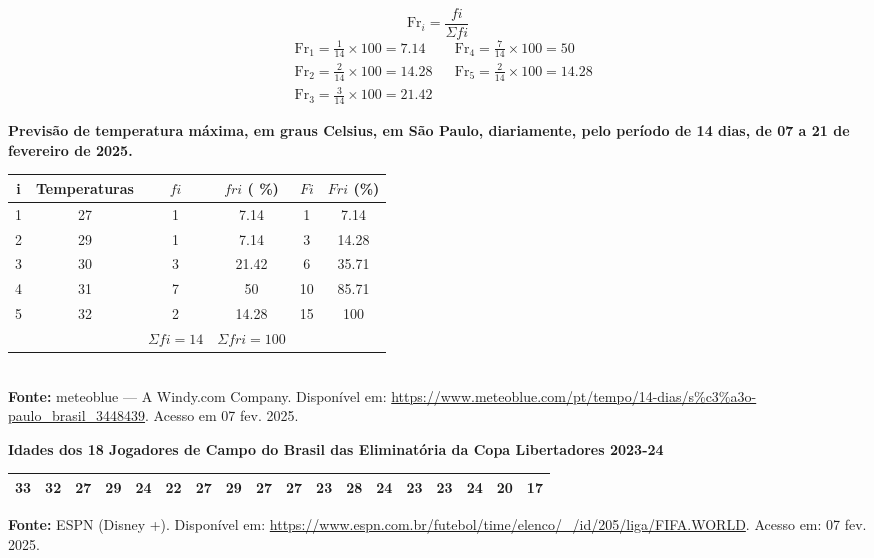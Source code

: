 \documentclass{jhwhw}
\newcommand{\fr}{\mathrm{Fr}}
\begin{document}
\[
    \fr_i = \frac{fi}{\Sigma fi} 
\]
\begin{align*}
    & \fr_1 = \frac{1}{14} \times 100 = 7.14   & & \fr_4 = \frac{7}{14} \times 100 = 50 \\
    & \fr_2 = \frac{2}{14} \times 100 = 14.28  & & \fr_5 = \frac{2}{14} \times 100 = 14.28 \\
    & \fr_3 = \frac{3}{14} \times 100 = 21.42  & &
\end{align*}
\begin{center}
    \textbf{Previsão de temperatura máxima, em graus Celsius, em São Paulo, diariamente, pelo período de 14 dias, de 07 a 21 de fevereiro de 2025.}
    \begin{tabular}{c | c | c | c | c | c}
        \hline
        i & Temperaturas & $fi$ & $fri$ ( \%) & $Fi$ & $Fri$ (\%) \\
        \hline
        1 & 27           & 1    & 7.14         & 1    & 7.14  \\
        2 & 29           & 1    & 7.14        & 3    & 14.28  \\
        3 & 30           & 3    & 21.42        & 6    & 35.71  \\
        4 & 31           & 7    & 50           & 10   & 85.71  \\
        5 & 32           & 2    & 14.28        & 15   & 100  \\
        \hline
          &              &  $\Sigma fi = 14 $    & $ \Sigma fri = 100 $            &      & 
    \end{tabular}\\
    \textbf{Fonte:} meteoblue --- A Windy.com Company. Disponível em: \url{https://www.meteoblue.com/pt/tempo/14-dias/s\%c3\%a3o-paulo\_brasil\_3448439}. Acesso em 07 fev. 2025.
\end{center}
\newpage
{}
\begin{center}
    \textbf{Idades dos 18 Jogadores de Campo do Brasil das Eliminatória da Copa Libertadores 2023-24}
    \begin{tabular}{llllllllllllllllll}
        \hline 33 & 32 & 27 & 29 & 24 & 22 & 27 & 29 & 27 & 27 & 23 & 28 & 24 & 23 & 23 & 24 & 20 & 17 \\
        \hline
    \end{tabular}
    \textbf{Fonte:} ESPN (Disney +). Disponível em: \url{https://www.espn.com.br/futebol/time/elenco/\_/id/205/liga/FIFA.WORLD}. Acesso em: 07 fev. 2025.
\end{center}
\end{document}
